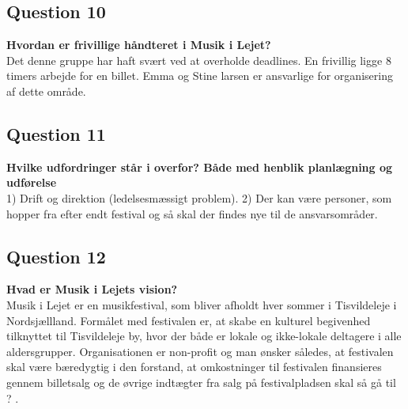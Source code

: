 \subsection{Question 10}
\label{i1q10}
\noindent \textbf{Hvordan er frivillige håndteret i Musik i Lejet?} \\
Det denne gruppe har haft svært ved at overholde deadlines. En frivillig ligge 8 timers arbejde for en billet. Emma og Stine larsen er ansvarlige for organisering af dette område.


\subsection{Question 11}
\label{i1q11}
\noindent \textbf{Hvilke udfordringer står i overfor? Både med henblik planlægning og udførelse} \\
1) Drift og direktion (ledelsesmæssigt problem). 
2) Der kan være personer, som hopper fra efter endt festival og så skal der findes nye til de ansvarsområder.


\subsection{Question 12}
\label{i1q12}
\noindent \textbf{Hvad er Musik i Lejets vision?} \\
Musik i Lejet er en musikfestival, som bliver afholdt hver sommer i Tisvildeleje i Nordsjællland. Formålet med festivalen er, at skabe en kulturel begivenhed tilknyttet til Tisvildeleje by, hvor der både er lokale og ikke-lokale deltagere i alle aldersgrupper. Organisationen er non-profit og man ønsker således, at festivalen skal være bæredygtig i den forstand, at omkostninger til festivalen finansieres gennem billetsalg og de øvrige indtægter fra salg på festivalpladsen skal så gå til ? . 
